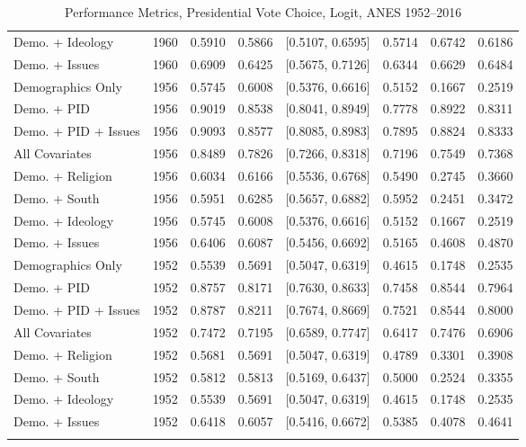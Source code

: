 \begin{longtable}{lrrrlrrr}
  Demo. + Ideology & 1960 & 0.5910 & 0.5866 & [0.5107, 0.6595] & 0.5714 & 0.6742 & 0.6186 \\ 
  Demo. + Issues & 1960 & 0.6909 & 0.6425 & [0.5675, 0.7126] & 0.6344 & 0.6629 & 0.6484 \\ 
  Demographics Only & 1956 & 0.5745 & 0.6008 & [0.5376, 0.6616] & 0.5152 & 0.1667 & 0.2519 \\ 
  Demo. + PID & 1956 & 0.9019 & 0.8538 & [0.8041, 0.8949] & 0.7778 & 0.8922 & 0.8311 \\ 
  Demo. + PID + Issues & 1956 & 0.9093 & 0.8577 & [0.8085, 0.8983] & 0.7895 & 0.8824 & 0.8333 \\ 
  All Covariates & 1956 & 0.8489 & 0.7826 & [0.7266, 0.8318] & 0.7196 & 0.7549 & 0.7368 \\ 
  Demo. + Religion & 1956 & 0.6034 & 0.6166 & [0.5536, 0.6768] & 0.5490 & 0.2745 & 0.3660 \\ 
  Demo. + South & 1956 & 0.5951 & 0.6285 & [0.5657, 0.6882] & 0.5952 & 0.2451 & 0.3472 \\ 
  Demo. + Ideology & 1956 & 0.5745 & 0.6008 & [0.5376, 0.6616] & 0.5152 & 0.1667 & 0.2519 \\ 
  Demo. + Issues & 1956 & 0.6406 & 0.6087 & [0.5456, 0.6692] & 0.5165 & 0.4608 & 0.4870 \\ 
  Demographics Only & 1952 & 0.5539 & 0.5691 & [0.5047, 0.6319] & 0.4615 & 0.1748 & 0.2535 \\ 
  Demo. + PID & 1952 & 0.8757 & 0.8171 & [0.7630, 0.8633] & 0.7458 & 0.8544 & 0.7964 \\ 
  Demo. + PID + Issues & 1952 & 0.8787 & 0.8211 & [0.7674, 0.8669] & 0.7521 & 0.8544 & 0.8000 \\ 
  All Covariates & 1952 & 0.7472 & 0.7195 & [0.6589, 0.7747] & 0.6417 & 0.7476 & 0.6906 \\ 
  Demo. + Religion & 1952 & 0.5681 & 0.5691 & [0.5047, 0.6319] & 0.4789 & 0.3301 & 0.3908 \\ 
  Demo. + South & 1952 & 0.5812 & 0.5813 & [0.5169, 0.6437] & 0.5000 & 0.2524 & 0.3355 \\ 
  Demo. + Ideology & 1952 & 0.5539 & 0.5691 & [0.5047, 0.6319] & 0.4615 & 0.1748 & 0.2535 \\ 
  Demo. + Issues & 1952 & 0.6418 & 0.6057 & [0.5416, 0.6672] & 0.5385 & 0.4078 & 0.4641 \\ 
   \bottomrule
\caption{Performance Metrics, Presidential Vote Choice, Logit, ANES 1952--2016} 
\label{tab:ANES_prezvote_logit}
\end{longtable}
